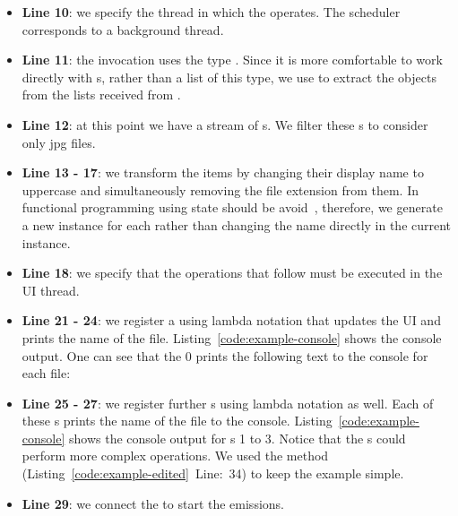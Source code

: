 \documentclass[type=bsc,accentcolor=tud9c]{tudthesis}
\begin{document}
\begin{itemize}
	\item {\bfseries Line 10}: we specify the thread in which the  operates. The scheduler  corresponds to a background thread.
	\item {\bfseries Line 11}: the  invocation uses the type . Since it is more comfortable to work directly with s, rather than a list of this type, we use  to extract the  objects from the lists received from .
	\item {\bfseries Line 12}: at this point we have a stream of s. We filter these s to consider only jpg files.
	\item {\bfseries Line 13 - 17}: we transform the items by changing their display name to uppercase and simultaneously removing the file extension from them. In functional programming using state should be avoid~\cite{bookFunctionalProgramming}, therefore, we generate a new instance for each  rather than changing the name directly in the current instance. 
	\item {\bfseries Line 18}: we specify that the operations that follow must be executed in the UI thread.
	\item {\bfseries Line 21 - 24}: we register a  using lambda notation that updates the UI and prints the name of the file. Listing~\ref{code:example-console} shows the console output. One can see that the  0 prints the following text to the console for each file: 
	\item {\bfseries Line 25 - 27}: we register further s using lambda notation as well. Each of these s prints the name of the file to the console. Listing~\ref{code:example-console} shows the console output for s 1 to 3. Notice that the s could perform more complex operations. We used the method  (Listing~\ref{code:example-edited}~Line:~34) to keep the example simple.
	\item {\bfseries Line 29}: we connect the  to start the emissions.
\end{itemize}




\end{document}
